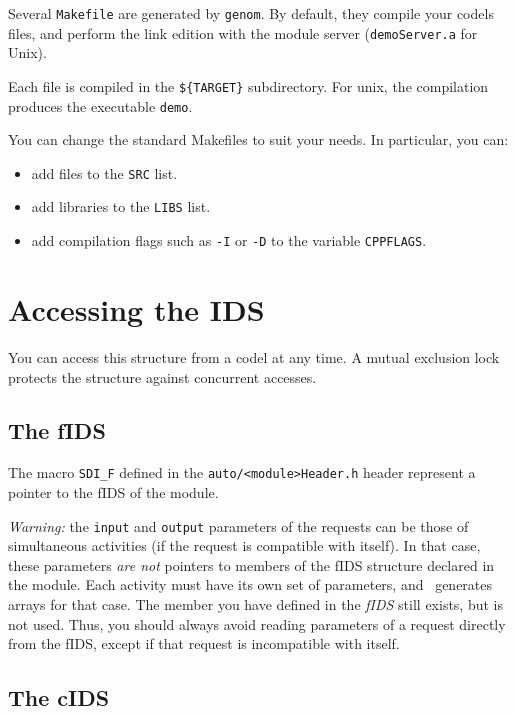 Several {\tt  Makefile} are generated   by {\tt genom}.  By default, they
compile your codels  files, and perform the  link edition with the module
server ({\tt demoServer.a} for Unix).

Each file  is compiled in the {\tt  \$\{TARGET\}} subdirectory. For unix,
the compilation  produces the executable {\tt demo}.

You can change the standard Makefiles to suit your needs. In particular,
you can:

\begin{itemize}
\item add files to the {\tt SRC} list.
\item add libraries to the {\tt LIBS} list.
\item add compilation flags such as {\tt -I} or {\tt -D} to the  variable
{\tt CPPFLAGS}.
\end{itemize}


\section{Accessing the IDS}

You can access   this  structure from a  codel  at  any time.   A  mutual
exclusion lock protects the structure against concurrent accesses.

\subsection{The fIDS}

The macro {\tt SDI\_F}  defined in the {\tt auto/<module>Header.h} header
represent a pointer to the fIDS of the module.

{\em Warning:} the   {\tt input}  and {\tt   output} parameters  of   the
requests  can  be those  of simultaneous activities  (if  the  request is
compatible with  itself).  In that case, these  parameters {\em  are not}
pointers to members of  the fIDS structure declared in  the module.  Each
activity  must have  its own  set  of  parameters, and \GenoM\  generates
arrays for that case. The member you have defined in the {\em fIDS} still
exists, but is not used. Thus, you should always avoid reading parameters
of  a  request  directly  from the  fIDS,  except    if that request   is
incompatible with itself.


\subsection{The cIDS}

